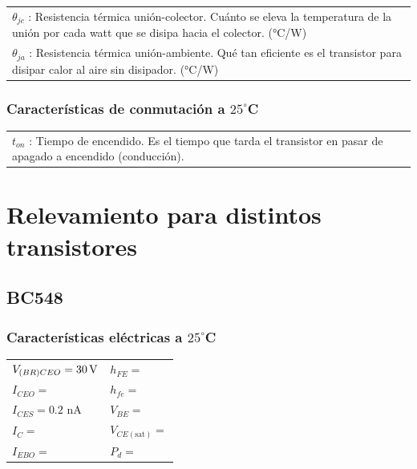 \documentclass[chaptersright]{informeutn}
\begin{document}
\begin{tabular}{p{14cm}}
    $\theta_{jc}$ : Resistencia térmica unión-colector. Cuánto se eleva la temperatura de la unión por cada watt que se disipa hacia el colector. (°C/W) \\
    $\theta_{ja}$ : Resistencia térmica unión-ambiente. Qué tan eficiente es el transistor para disipar calor al aire sin disipador. (°C/W) \\
\end{tabular}

\vspace{1em}
\subsubsection{Características de conmutación a $25^\circ$C}

\begin{tabular}{p{14cm}}
    $t_{on}$ : Tiempo de encendido. Es el tiempo que tarda el transistor en pasar de apagado a encendido (conducción). \\
\end{tabular}

  \section{Relevamiento para distintos transistores}

    \subsection{BC548}
  
    \subsubsection{Características eléctricas a $25^\circ$C}
    \begin{tabular}{ll}
    $V_{(BR)CEO} = 30 \,\mathrm{V}$         & \hspace{2cm} $h_{FE} = $ \\
    $I_{CEO} = $             & \hspace{2cm} $h_{fe} = $ \\
    $I_{CES} = 0.2 $ nA             & \hspace{2cm} $V_{BE} = $ \\
    $I_C = $                 & \hspace{2cm} $V_{CE(\text{sat})} = $ \\
    $I_{EBO} = $             & \hspace{2cm} $P_d = $ \\
    \end{tabular}
    
\end{document}
